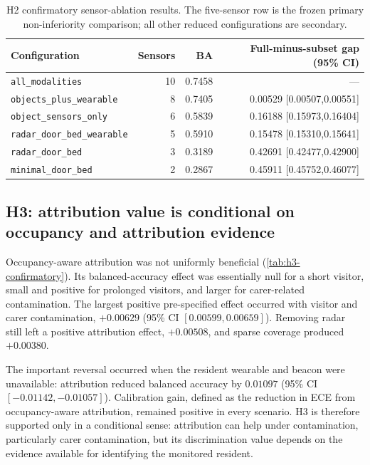 \begin{table}[t]
\centering
\small
\caption{H2 confirmatory sensor-ablation results. The five-sensor row is the frozen primary non-inferiority comparison; all other reduced configurations are secondary.}
\label{tab:h2-confirmatory}
\begin{tabular}{lrrr}
\toprule
Configuration & Sensors & BA & Full-minus-subset gap (95\% CI) \\
\midrule
\texttt{all\_modalities} & 10 & 0.7458 & --- \\
\texttt{objects\_plus\_wearable} & 8 & 0.7405 & 0.00529 [0.00507,0.00551] \\
\texttt{object\_sensors\_only} & 6 & 0.5839 & 0.16188 [0.15973,0.16404] \\
\texttt{radar\_door\_bed\_wearable} & 5 & 0.5910 & 0.15478 [0.15310,0.15641] \\
\texttt{radar\_door\_bed} & 3 & 0.3189 & 0.42691 [0.42477,0.42900] \\
\texttt{minimal\_door\_bed} & 2 & 0.2867 & 0.45911 [0.45752,0.46077] \\
\bottomrule
\end{tabular}
\end{table}

\subsection{H3: attribution value is conditional on occupancy and attribution evidence}

Occupancy-aware attribution was not uniformly beneficial (\cref{tab:h3-confirmatory}). Its balanced-accuracy effect was essentially null for a short visitor, small and positive for prolonged visitors, and larger for carer-related contamination. The largest positive pre-specified effect occurred with visitor and carer contamination, $+0.00629$ (95\% CI $[0.00599,0.00659]$). Removing radar still left a positive attribution effect, $+0.00508$, and sparse coverage produced $+0.00380$.

The important reversal occurred when the resident wearable and beacon were unavailable: attribution reduced balanced accuracy by $0.01097$ (95\% CI $[-0.01142,-0.01057]$). Calibration gain, defined as the reduction in ECE from occupancy-aware attribution, remained positive in every scenario. H3 is therefore supported only in a conditional sense: attribution can help under contamination, particularly carer contamination, but its discrimination value depends on the evidence available for identifying the monitored resident.

